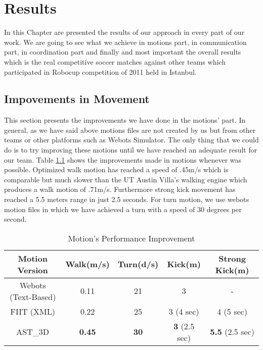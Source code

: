 \chapter{Results}
\label{results}
In this Chapter are presented the results of our approach in every part of our work. We are going to see what we achieve in motions part, in communication part, in coordination part and finally and most important the overall results which is the real competitive soccer matches against other teams which participated in Robocup competition of 2011 held in Istanbul.

\section{Impovements in Movement}
This section presents the improvements we have done in the motions' part. In general, as we have said above motions files are not created by us but from other teams or other platforms such as Webots Simulator. The only thing that we could do is to try improving these motions until we have reached an adequate result for our team. Table \ref{MotionImprovements} shows the improvements made in motions whenever was possible. Optimized walk motion has reached a speed of .45m/s which is comparable but much slower than the UT Austin Villa's walking engine which produces a walk motion of .71m/s. Furthermore strong kick movement has reached a 5.5 meters range in just 2.5 seconds. For turn motion, we use webots motion files in which we have achieved a turn with a speed of 30 degrees per second. 

\begin{table}
\begin{center}
\begin{tabular}{ccccc}
\textbf{Motion Version} & \textbf{Walk(m/s)}	& \textbf{Turn(d/s)}	& \textbf{Kick(m)}&\textbf{Strong Kick(m)} \\
\midrule
Webots (Text-Based) 		& 0.11 				& 21 				& 3 				& - \\
FIIT (XML)				& 0.22 				& 25 				& 3 (4 sec) 		& 4 (5 sec) \\
AST\_3D 		&  \textbf{0.45} 	& \textbf{30} 		& \textbf{3} (2.5 sec)& \textbf{5.5} (2.5 sec) \\
\end{tabular}
\end{center}
\label{MotionImprovements}
\caption{Motion's Performance Improvement}
\end{table}



